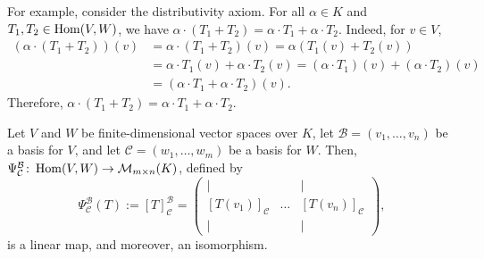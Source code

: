 For example, consider the distributivity axiom. For all $\alpha \in K$ and $T_1, T_2 \in \operatorname{Hom}(V,W)$, we have $\alpha \cdot (T_1 + T_2) = \alpha \cdot T_1 + \alpha \cdot T_2$. Indeed, for $v \in V$,
\begin{align*}
  (\alpha \cdot (T_1 + T_2))(v) &= \alpha \cdot (T_1 + T_2)(v) = \alpha(T_1(v) + T_2(v)) \\
  &= \alpha \cdot T_1(v) + \alpha \cdot T_2(v) = (\alpha \cdot T_1)(v) + (\alpha \cdot T_2)(v) \\
  &= (\alpha \cdot T_1 + \alpha \cdot T_2)(v).
\end{align*}
Therefore, $\alpha \cdot (T_1 + T_2) = \alpha \cdot T_1 + \alpha \cdot T_2$.

\begin{theorem}
  \label{thm:homomorphism_isomorphism}
  Let $V$ and $W$ be finite-dimensional vector spaces over $K$, let $\mathcal{B} = (v_1, \dots, v_n)$ be a basis for $V$, and let $\mathcal{C} = (w_1, \dots, w_m)$ be a basis for $W$. Then, $\Psi_{\mathcal{C}}^{\mathcal{B}} \colon \operatorname{Hom}(V,W) \to \mathcal{M}_{m \times n}(K)$, defined by
  \[ \Psi_{\mathcal{C}}^{\mathcal{B}}(T) := [T]_{\mathcal{C}}^{\mathcal{B}} = \begin{pmatrix} | & & | \\ [T(v_1)]_{\mathcal{C}} & \dots & [T(v_n)]_{\mathcal{C}} \\ | & & | \end{pmatrix}, \]
  is a linear map, and moreover, an isomorphism.
\end{theorem}

